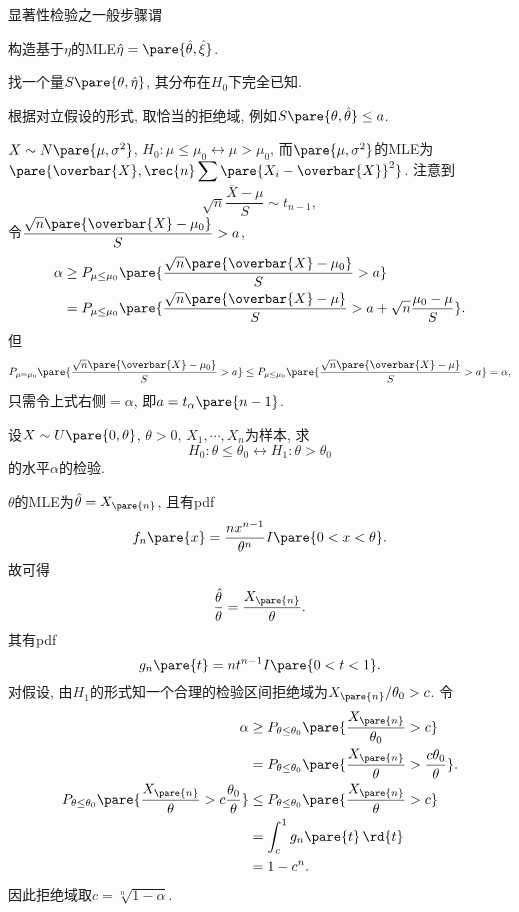 \documentclass[../Statistics.tex]{subfiles}
\begin{document}
\par
显著性检验之一般步骤谓
\begin{cenum}
    \item 构造基于$\eta$的MLE$\hat\eta = \pare{\hat\theta,\hat\xi}$.
    \item 找一个量$S\pare{\theta,\hat\eta}$, 其分布在$H_0$下完全已知.
    \item 根据对立假设的形式, 取恰当的拒绝域, 例如$S\pare{\theta,\hat{\theta}}\le a$.
\end{cenum}
\begin{sample}
    \begin{ex}
        $X\sim N\pare{\mu,\sigma^2}$, $H_0:\mu\le \mu_0\leftrightarrow \mu > \mu_0$, 而$\pare{\mu,\sigma^2}$的MLE为$\pare{\overbar{X},\displaystyle \rec{n}\displaystyle \sum\pare{X_i - \overbar{X}}^2}$. 注意到
        \[ \sqrt{n} \frac{\overbar{X} - \mu}{S} \sim t_{n-1}, \]
        令$\displaystyle \frac{\sqrt{n}\pare{\overbar{X} - \mu_0}}{S} > a$,
        \begin{align*}
            \alpha &\ge P_{\mu\le\mu_0}\pare{\frac{\sqrt{n}\pare{\overbar{X} - \mu_0}}{S} > a} \\
            &= P_{\mu\le\mu_0} \pare{\frac{\sqrt{n}\pare{\overbar{X}-\mu}}{S} > a + \sqrt{n} \frac{\mu_0-\mu}{S}}.
        \end{align*}
        但
        \[ P_{\mu = \mu_0}\pare{\frac{\sqrt{n}\pare{\overbar{X} - \mu_0}}{S}> a} \le  P_{\mu \le \mu_0}\pare{\frac{\sqrt{n}\pare{\overbar{X} - \mu}}{S}> a} = \alpha, \]
        只需令上式右侧$=\alpha$, 即$a=t_\alpha\pare{n-1}$.
    \end{ex}
\end{sample}
\begin{sample}
    \begin{ex}
        设$X\sim U\pare{0,\theta}$, $\theta>0$, $X_1,\cdots,X_n$为样本, 求
        \[ H_0:\theta \le \theta_0 \leftrightarrow H_1:\theta > \theta_0 \]
        的水平$\alpha$的检验.
    \end{ex}
    \begin{solution}
        $\theta$的MLE为$\hat\theta = X_{\pare{n}}$, 且有pdf
        \[ f_n\pare{x} = \frac{nx^{n-1}}{\theta^n}I\pare{0<x<\theta}. \]
        故可得
        \[ \frac{\hat\theta}{\theta} = \frac{X_{\pare{n}}}{\theta}. \]
        其有pdf
        \[ g_n\pare{t} = nt^{n-1} I\pare{0<t<1}. \]
        对假设, 由$H_1$的形式知一个合理的检验区间拒绝域为$X_{\pare{n}}/\theta_0 > c$. 令
        \begin{align*}
            \alpha &\ge P_{\theta \le \theta_0}\pare{\frac{X_{\pare{n}}}{\theta_0}>c} \\
            &= P_{\theta\le \theta_0}\pare{\frac{X_{\pare{n}}}{\theta} > \frac{c\theta_0}{\theta}}. \\
            P_{\theta\le\theta_0}\pare{\frac{X_{\pare{n}}}{\theta} > c\frac{\theta_0}{\theta}}  &\le P_{\theta \le \theta_0}\pare{\frac{X_{\pare{n}}}{\theta} > c} \\
            &= \int_c^1 g_n\pare{t}\,\rd{t} \\
            &= 1-c^n.
        \end{align*}
        因此拒绝域取$c = \sqrt[n]{1-\alpha}$.
    \end{solution}
\end{sample}
\end{document}
